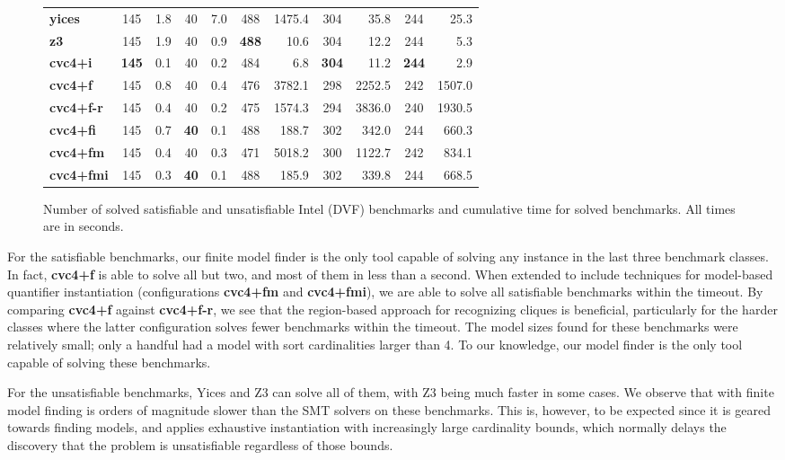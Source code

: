 \documentclass{svjour3}                     %
\begin{document}
\begin{figure}[t]
\begin{tabular}{|l|c|r|c|r|c|r|c|r|c|r|}
{\bf yices} & 145 & 1.8 & 40 & 7.0 & 488 & 1475.4 & 304 & 35.8 & 244 & 25.3
\\
{\bf z3} & 145 & 1.9 & 40 & 0.9 & {\bf 488} & 10.6 & 304 & 12.2 & 244 & 5.3
\\
{\bf cvc4+i} & {\bf 145} & 0.1 & 40 & 0.2 & 484 & 6.8 & {\bf 304} & 11.2 & {\bf 244} & 2.9
\\
{\bf cvc4+f} & 145 & 0.8 & 40 & 0.4 & 476 & 3782.1 & 298 & 2252.5 & 242 & 1507.0
\\
{\bf cvc4+f-r} & 145 & 0.4 & 40 & 0.2 & 475 & 1574.3 & 294 & 3836.0 & 240 & 1930.5
\\
{\bf cvc4+fi } & 145 & 0.7 & {\bf 40} & 0.1 & 488 & 188.7 & 302 & 342.0 & 244 & 660.3
\\
{\bf cvc4+fm } & 145 & 0.4 & 40 & 0.3 & 471 & 5018.2 & 300 & 1122.7 & 242 & 834.1
\\
{\bf cvc4+fmi } & 145 & 0.3 & {\bf 40} & 0.1 & 488 & 185.9 & 302 & 339.8 & 244 & 668.5
\\
\hline
\end{tabular}
\caption{Number of solved satisfiable and unsatisfiable Intel (DVF) benchmarks and cumulative time for solved benchmarks. All times are in seconds.}
\label{fig:dvf-results}
\end{figure}

For the satisfiable benchmarks, our finite model finder is the only tool capable 
of solving any instance in the last three benchmark classes.
In fact, {\bf cvc4+f} is able to solve all but two, and 
most of them in less than a second.
When extended to include techniques for model-based quantifier instantiation (configurations {\bf cvc4+fm} and {\bf cvc4+fmi}),
we are able to solve all satisfiable benchmarks within the timeout.
By comparing {\bf cvc4+f} against {\bf cvc4+f-r}, we see that the region-based approach for recognizing cliques is beneficial, 
particularly for the harder classes where the latter configuration solves fewer benchmarks within the timeout.
The model sizes found for these benchmarks were relatively small; 
only a handful had a model with sort cardinalities larger than 4.
To our knowledge, our model finder is the only tool capable of solving these benchmarks.

For the unsatisfiable benchmarks, Yices and Z3 can solve all of them,
 with Z3 being much faster in some cases.
We observe that \cvc with finite model finding is orders of magnitude slower 
than the SMT solvers on these benchmarks.
This is, however, to be expected since it is geared 
towards finding models, and applies exhaustive instantiation 
with increasingly large cardinality bounds,
which normally delays the discovery that 
the problem is unsatisfiable regardless of those bounds.
\end{document}

